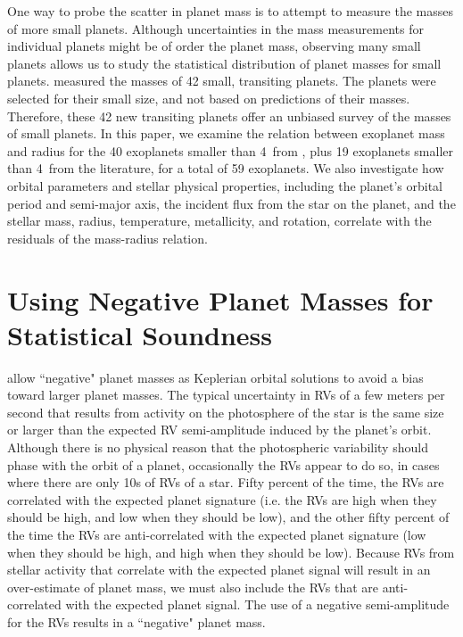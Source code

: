 \documentclass[11pt]{aastex}
\begin{document}
One way to probe the scatter in planet mass is to attempt to measure the masses of more small planets.  Although uncertainties in the mass measurements for individual planets might be of order the planet mass, observing many small planets allows us to study the statistical distribution of planet masses for small planets.  \citet{Marcy2013} measured the masses of 42 small, transiting planets.  The planets were selected for their small size, and not based on predictions of their masses.  Therefore, these 42 new transiting planets offer an unbiased survey of the masses of small planets.  In this paper, we examine the relation between exoplanet mass and radius for the 40 exoplanets smaller than 4\rearth\ from \citet{Marcy2013}, plus 19 exoplanets smaller than 4\rearth\ from the literature, for a total of 59 exoplanets.  We also investigate how orbital parameters and stellar physical properties, including the planet's orbital period and semi-major axis, the incident flux from the star on the planet, and the stellar mass, radius, temperature, metallicity, and rotation, correlate with the residuals of the mass-radius relation.

\section{Using Negative Planet Masses for Statistical Soundness}
\citet{Marcy2013} allow ``negative" planet masses as Keplerian orbital solutions to avoid a bias toward larger planet masses.  The typical uncertainty in RVs of a few meters per second that results from activity on the photosphere of the star is the same size or larger than the expected RV semi-amplitude induced by the planet's orbit.  Although there is no physical reason that the photospheric variability should phase with the orbit of a planet, occasionally the RVs appear to do so, in cases where there are only 10s of RVs of a star.  Fifty percent of the time, the RVs are correlated with the expected planet signature (i.e. the RVs are high when they should be high, and low when they should be low), and the other fifty percent of the time the RVs are anti-correlated with the expected planet signature (low when they should be high, and high when they should be low).  Because RVs from stellar activity that correlate with the expected planet signal will result in an over-estimate of planet mass, we must also include the RVs that are anti-correlated with the expected planet signal.  The use of a negative semi-amplitude for the RVs results in a ``negative" planet mass.  
\end{document}
